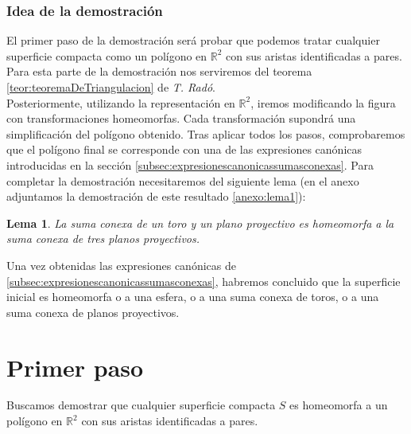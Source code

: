 \documentclass[a4paper,11pt,spanish, twoside, leqno]{tfg-uam}
\newcommand*{\reales}{\mathbb{R}}
\newtheorem{lema}[teor]{Lema}
\theoremstyle{definition}
\begin{document}
\subsubsection*{Idea de la demostración}
El primer paso de la demostración será probar que podemos tratar cualquier superficie compacta como un polígono en $\reales^2$ con sus aristas identificadas a pares. Para esta parte de la demostración nos serviremos del teorema \ref{teor:teoremaDeTriangulacion} de \textit{T. Radó}.\\
Posteriormente, utilizando la representación en $\reales^2$, iremos modificando la figura con transformaciones homeomorfas. Cada transformación supondrá una simplificación del polígono obtenido. Tras aplicar todos los pasos, comprobaremos que el polígono final se corresponde con una de las expresiones canónicas introducidas en la sección \ref{subsec:expresionescanonicassumasconexas}. Para completar la demostración necesitaremos del siguiente lema (en el anexo adjuntamos la demostración de este resultado \ref{anexo:lema1}):
\begin{lema}\label{lema:planop+toro=3planop}
La suma conexa de un toro y un plano proyectivo es homeomorfa a la suma conexa de tres planos proyectivos.
\end{lema}
Una vez obtenidas las expresiones canónicas de \ref{subsec:expresionescanonicassumasconexas}, habremos concluido que la superficie inicial es homeomorfa o a una esfera, o a una suma conexa de toros, o a una suma conexa de planos proyectivos.\\

\section{Primer paso}
\label{seccion primer paso}
Buscamos demostrar que cualquier superficie compacta $S$ es homeomorfa a un polígono en $\reales^2$ con sus aristas identificadas a pares.
\end{document}
